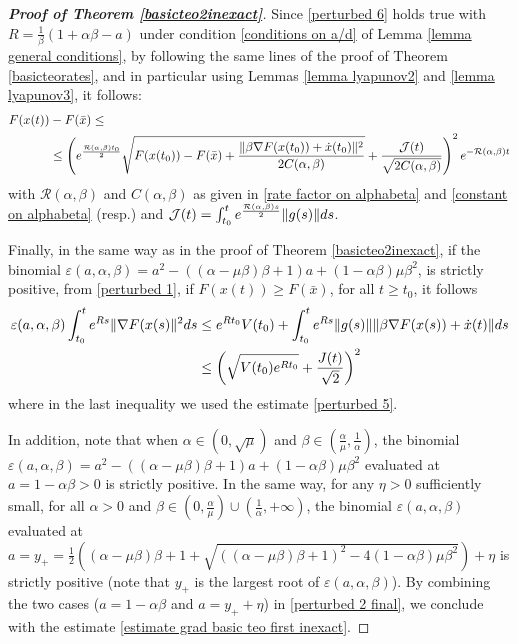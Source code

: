 \documentclass[reqno]{amsart}
\theoremstyle{plain}
\theoremstyle{definition}
\theoremstyle{remark}
\DeclarePairedDelimiter{\norm}{\lVert}{\rVert}	%
\newcommand{\Jb}{\mathcal{J}}
\newcommand{\Rb}{\mathcal{R}}
\begin{document}
\begin{proof}[\textbf{Proof of Theorem \ref{basicteo2inexact}}]
	Since \eqref{perturbed 6} holds true with $R=\frac{1}{\beta}(1+\alpha\beta-a)$ under condition \eqref{conditions on a/d} of Lemma \ref{lemma general conditions}, by following the same lines of the proof of Theorem \ref{basicteorates}, and in particular using Lemmas \ref{lemma lyapunov2} and \ref{lemma lyapunov3}, it follows:
	\begin{equation}\label{perturbed 7}
		\begin{aligned}
			F(x(t)) & -  F(\bar{x}) \leq \\
			& \leq  \left( e^{\frac{\Rb(\alpha,\beta)t_{0}}{2}}\sqrt{F(x(t_{0})) - F(\bar{x}) +\frac{\norm{\beta\nabla F(x(t_{0}))+\dot{x}(t_{0})}^{2}}{2C(\alpha,\beta)}} + \frac{\Jb(t)}{\sqrt{2C(\alpha,\beta)}}\right)^{2}e^{-\Rb(\alpha,\beta) t}
		\end{aligned}
	\end{equation} 
	with $\Rb(\alpha,\beta)$ and $C(\alpha,\beta)$ as given in \eqref{rate factor on alphabeta} and \eqref{constant on alphabeta} (resp.) and $\Jb(t)= \int_{t_{0}}^{t}e^{\frac{\Rb(\alpha,\beta)s}{2}}\norm{g(s)}ds$.
	
	
	Finally, in the same way as in the proof of Theorem \ref{basicteo2inexact}, if the binomial $\varepsilon(a,\alpha,\beta)=a^2 - \left((\alpha-\mu\beta)\beta +1\right)a + (1-\alpha\beta)\mu\beta^{2}$, is strictly positive, from \eqref{perturbed 1}, if $F(x(t)) \geq F(\bar{x})$, for all $t\geq t_{0}$, it follows
	\begin{equation}\label{perturbed 2 final}
		\begin{aligned}
			\varepsilon(a,\alpha,\beta)\int_{t_{0}}^{t}e^{Rs}\norm{\nabla F(x(s)}^{2}ds & \leq e^{Rt_{0}}V(t_{0}) + \int_{t_{0}}^{t}e^{Rs}\norm{g(s)}\norm{\beta\nabla F(x(s))+\dot{x}(t)}ds	\\
			&\leq \left(\sqrt{V(t_{0})e^{Rt_{0}}} + \frac{J(t)}{\sqrt{2}}\right)^{2}
		\end{aligned}
	\end{equation}
	where in the last inequality we used the estimate \eqref{perturbed 5}.
	
	In addition, note that when  $\alpha \in (0,\sqrt{\mu})$ and $\beta\in \left(\frac{\alpha}{\mu},\frac{1}{\alpha}\right)$, the binomial $\varepsilon(a,\alpha,\beta) = a^2 - \left((\alpha-\mu\beta)\beta +1\right)a + (1-\alpha\beta)\mu\beta^{2}$ evaluated at $a=1-\alpha\beta>0$ is strictly positive. In the same way, for any $\eta>0$ sufficiently small, for all $\alpha>0$ and $\beta\in\left(0,\frac{\alpha}{\mu}\right)\cup\left(\frac{1}{\alpha},+\infty\right)$, the binomial $\varepsilon(a,\alpha,\beta)$ evaluated at $a=y_{+}=\frac{1}{2}\left((\alpha-\mu\beta)\beta+1 + \sqrt{\left((\alpha-\mu\beta)\beta+1\right)^{2}-4(1-\alpha\beta)\mu\beta^{2}}\right)+\eta$ is strictly positive (note that $y_{+}$ is the largest root of $\varepsilon(a,\alpha,\beta)$). By combining the two cases ($a=1-\alpha\beta$ and $a=y_{+}+\eta$) in \eqref{perturbed 2 final}, we conclude with the estimate \eqref{estimate grad basic teo first inexact}.
\end{proof}
\end{document}
